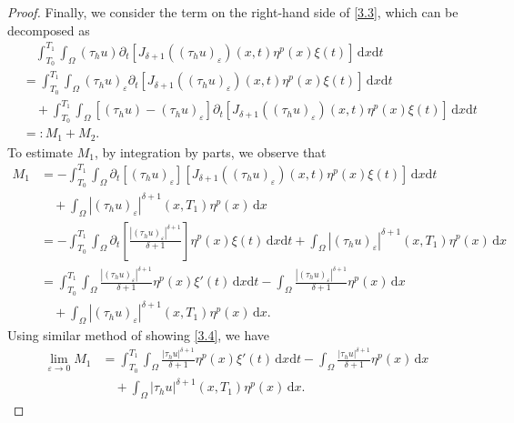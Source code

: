 \documentclass[reqno,10pt]{amsart}
\numberwithin{equation}{section}
\begin{document}
\begin{proof}
	Finally, we consider the term on the right-hand side of \eqref{3.3}, which can be decomposed as
	\begin{align}
		\label{3.5}
		&\quad\int_{T_0}^{T_1}\int_{\Omega}(\tau_hu)\partial_t\left[J_{\delta+1}\left((\tau_hu)_{\varepsilon}\right)(x,t)\eta^p(x)\xi(t)\right]\,\mathrm{d}x\mathrm{d}t\nonumber\\
		&=\int_{T_0}^{T_1}\int_{\Omega}(\tau_hu)_\varepsilon\partial_t\left[J_{\delta+1}\left((\tau_hu)_{\varepsilon}\right)(x,t)\eta^p(x)\xi(t)\right]\,\mathrm{d}x\mathrm{d}t\nonumber\\
		&\quad+\int_{T_0}^{T_1}\int_{\Omega}\left[ (\tau_hu)-(\tau_hu)_\varepsilon\right] \partial_t\left[J_{\delta+1}\left((\tau_hu)_{\varepsilon}\right)(x,t)\eta^p(x)\xi(t)\right]\,\mathrm{d}x\mathrm{d}t\nonumber\\
		&=:M_1+M_2.
	\end{align}
	To estimate $M_1$, by integration by parts, we observe that
	\begin{align*}
		M_1&=-\int_{T_0}^{T_1}\int_{\Omega}\partial_t[(\tau_hu)_\varepsilon]\left[J_{\delta+1}\left((\tau_hu)_{\varepsilon}\right)(x,t)\eta^p(x)\xi(t)\right]\,\mathrm{d}x\mathrm{d}t\\
		&\quad+\int_{\Omega}\left|(\tau_hu)_\varepsilon\right|^{\delta+1}(x,T_1)\eta^p(x)\,\mathrm{d}x\\
		&=-\int_{T_0}^{T_1}\int_{\Omega}\partial_t\left[\frac{|(\tau_hu)_\varepsilon|^{\delta+1}}{\delta+1}\right]\eta^p(x)\xi(t)\,\mathrm{d}x\mathrm{d}t+\int_{\Omega}\left|(\tau_hu)_\varepsilon\right|^{\delta+1}(x,T_1)\eta^p(x)\,\mathrm{d}x\\
		&=\int_{T_0}^{T_1}\int_{\Omega}\frac{|(\tau_hu)_\varepsilon|^{\delta+1}}{\delta+1}\eta^p(x)\xi'(t)\,\mathrm{d}x\mathrm{d}t-\int_{\Omega}\frac{|(\tau_hu)_\varepsilon|^{\delta+1}}{\delta+1}\eta^p(x)\,\mathrm{d}x\\
		&\quad+\int_{\Omega}\left|(\tau_hu)_\varepsilon\right|^{\delta+1}(x,T_1)\eta^p(x)\,\mathrm{d}x.
	\end{align*}
	Using similar method of showing \eqref{3.4}, we have
	\begin{align}
		\label{3.6}
		\lim\limits_{\varepsilon\rightarrow0}M_1&=\int_{T_0}^{T_1}\int_{\Omega}\frac{|\tau_hu|^{\delta+1}}{\delta+1}\eta^p(x)\xi'(t)\,\mathrm{d}x\mathrm{d}t-\int_{\Omega}\frac{|\tau_hu|^{\delta+1}}{\delta+1}\eta^p(x)\,\mathrm{d}x\nonumber\\
		&\quad+\int_{\Omega}\left|\tau_hu\right|^{\delta+1}(x,T_1)\eta^p(x)\,\mathrm{d}x.
	\end{align}

\end{proof}
\end{document}
